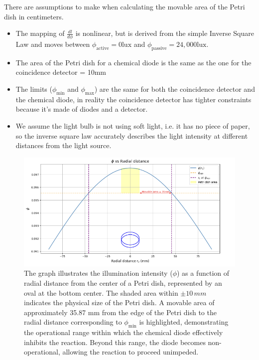 \begin{tcolorbox}[colback=red!5!white,colframe=blue!75!black,title=Assumptions for Light Intensity Calculation]
    There are assumptions to make when calculating the movable area of the Petri dish in centimeters.
\begin{itemize}
    \item The mapping of $\frac{dl}{d\phi}$ is nonlinear, but is derived from the simple Inverse Square Law and moves between $\phi_{\text{active}}=0\text{lux}$ and $\phi_{\text{passive}}=24,000\text{lux}$.
    \item The area of the Petri dish for a chemical diode is the same as the one for the coincidence detector = 10mm
    \item The limits ($\phi_{\text{min}}$ and $\phi_{\text{max}}$) are the same for both the coincidence detector and the chemical diode, in reality the coincidence detector has tighter constraints because it's made of diodes and a detector.
    \item We assume the light bulb is not using soft light, i.e. it has no piece of paper, so the inverse square law accurately describes the light intensity at different distances from the light source. 
\end{itemize}
\end{tcolorbox}

\begin{figure}[h]
    \centering
    \includegraphics[width=\textwidth]{images/Screenshot 2024-03-10 at 23.57.42.png}
    \caption{The graph illustrates the illumination intensity (\( \phi \)) as a function of radial distance from the center of a Petri dish, represented by an oval at the bottom center. The shaded area within \(\pm 10\,mm\) indicates the physical size of the Petri dish. A movable area of approximately 35.87 mm from the edge of the Petri dish to the radial distance corresponding to \( \phi_{\min} \) is highlighted, demonstrating the operational range within which the chemical diode effectively inhibits the reaction. Beyond this range, the diode becomes non-operational, allowing the reaction to proceed unimpeded.}
    \label{fig:petri-dish-illumination}
\end{figure}

